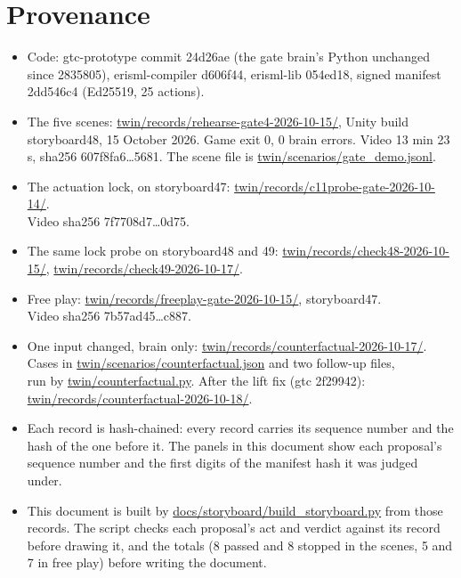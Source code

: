 \documentclass[11pt]{article}
\begin{document}
\section{Provenance}

\begin{itemize}[leftmargin=*,itemsep=3pt]
\item Code: gtc-prototype commit 24d26ae (the gate brain's Python unchanged since 2835805),
  erisml-compiler d606f44, erisml-lib 054ed18, signed manifest 2dd546c4 (Ed25519, 25 actions).
\item The five scenes: \url{twin/records/rehearse-gate4-2026-10-15/}, Unity build
  storyboard48, 15 October 2026. Game exit 0, 0 brain errors. Video 13 min 23 s, sha256
  607f8fa6\ldots5681. The scene file is \url{twin/scenarios/gate_demo.jsonl}.
\item The actuation lock, on storyboard47: \url{twin/records/c11probe-gate-2026-10-14/}.\\
  Video sha256 7f7708d7\ldots0d75.
\item The same lock probe on storyboard48 and 49: \url{twin/records/check48-2026-10-15/},
  \url{twin/records/check49-2026-10-17/}.
\item Free play: \url{twin/records/freeplay-gate-2026-10-15/}, storyboard47.\\
  Video sha256 7b57ad45\ldots c887.
\item One input changed, brain only: \url{twin/records/counterfactual-2026-10-17/}.\\
  Cases in \url{twin/scenarios/counterfactual.json} and two follow-up files,\\
  run by \url{twin/counterfactual.py}. After the lift fix (gtc 2f29942):\\
  \url{twin/records/counterfactual-2026-10-18/}.
\item Each record is hash-chained: every record carries its sequence number and the hash of the one
  before it. The panels in this document show each proposal's sequence number and the first digits
  of the manifest hash it was judged under.
\item This document is built by \url{docs/storyboard/build_storyboard.py} from those records.
  The script checks each proposal's act and verdict against its record before drawing it, and the
  totals (8 passed and 8 stopped in the scenes, 5 and 7 in free play) before writing the document.
\end{itemize}
\end{document}
